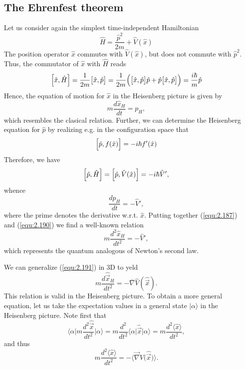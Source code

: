 \subsection*{The Ehrenfest theorem}
Let us consider again the simplest time-independent
Hamiltonian
\[\hat{H} = \frac{\hat{p}^2}{2m} + \hat{V}(\hat{x})\]
The position operator $\hat{x}$ commutes with
$\hat{V}(\hat{x})$, but does not commute with $\hat{p}^2$.
Thus, the commutator of $\hat{x}$ with $\hat{H}$ reads
\begin{equation}
  \Bigl[\hat{x}, \hat{H}\Bigr] = \frac{1}{2m} \bigl[\hat{x},
  \hat{p}\bigr] = \frac{1}{2m} \Bigl(
  \bigl[\hat{x}, \hat{p}\bigr] \hat{p} + \hat{p}
  \bigl[\hat{x}, \hat{p}\bigr]
  \Bigr)
  = \frac{i\hbar}{m} \hat{p}
  \label{equ:2.186}
\end{equation}
Hence, the equation of motion for $\hat{x}$ in the
Heisenberg picture is given by
\begin{equation}
  m \frac{d \hat{x}_H}{dt} = \hat{p}_H,
  \label{equ:2.187}
\end{equation}
which resembles the clasical relation. Further, we can
determine the Heisenberg equation for $\hat{p}$ by realizing
e.g. in the configuration space that
\begin{equation}
  \Bigl[\hat{p}, f(\hat{x})\Bigr] = -i \hbar f'(\hat{x})
  \label{equ:2.188}
\end{equation}
Therefore, we have
\begin{equation}
  \Bigl[\hat{p}, \hat{H}\Bigr] = \Bigl[\hat{p},
  \hat{V}(\hat{x})\Bigr] = -i\hbar \hat{V}',
  \label{equ:2.189}
\end{equation}
whence
\begin{equation}
  \frac{d \hat{p}_H}{dt} = - \hat{V}',
  \label{equ:2.190}
\end{equation}
where the prime denotes the derivative w.r.t. $\hat{x}$.
Putting together (\ref{equ:2.187}) and (\ref{equ:2.190}) we
find a well-known relation
\begin{equation}
  m \frac{d^2 \hat{x}_H}{dt^2} = - \hat{V}',
  \label{equ:2.191}
\end{equation}
which represents the quantum analogous of Newton's second
law.

We can generalize (\ref{equ:2.191}) in 3D to yeld
\begin{equation}
  m \frac{d \hat{\vec{x}}_H}{dt^2} =- \bar{\nabla}
  \hat{V}(\hat{\vec{x}}).
  \label{equ:2.192}
\end{equation}
 This relation is valid in the Heisenberg picture. To obtain
 a more general equation, let us take the expectation values
 in a general state $\vert \alpha \rangle$ in the Heisenberg
 picture. Note first that
 \begin{equation}
   \langle \alpha \vert m \frac{d^2 \hat{\vec{x}}}{dt^2}
   \vert \alpha \rangle = m \frac{d^2}{dt^2} \langle \alpha
   \vert \hat{\vec{x}} \vert \alpha \rangle = m \frac{d^2
   \langle \hat{x} \rangle}{dt^2},
   \label{equ:2.193}
 \end{equation}
 and thus
 \begin{equation}
   m \frac{d^2 \langle \hat{x} \rangle}{dt^2} = - \bigl\langle
   \vec{\nabla} V \bigl(\hat{\vec{x}}\bigr)\bigr\rangle.
   \label{equ:2.194}
 \end{equation}

